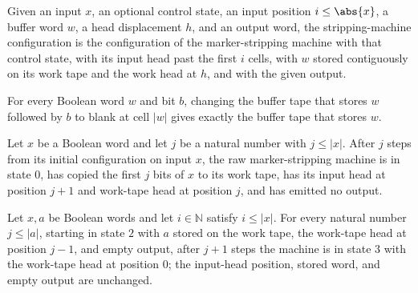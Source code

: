 \begin{definition}
\label{Turing.FinTM.stripCfg}
\leanok
{}
Given an input $x$, an optional control state, an input position
$i \le \abs{x}$, a buffer word $w$, a head displacement $h$, and an output
word, the stripping-machine configuration is the configuration of the
marker-stripping machine with that control state, with its input head past
the first $i$ cells, with $w$ stored contiguously on its work tape and the
work head at $h$, and with the given output.
\end{definition}

\begin{lemma}
\label{Turing.FinTM.catalogBuffer_erase}
\leanok
{}
For every Boolean word $w$ and bit $b$, changing the buffer tape that stores $w$
followed by $b$ to blank at cell $|w|$ gives exactly the buffer tape that stores $w$.
\end{lemma}

\begin{lemma}
\label{Turing.FinTM.rawStrip_copy}
\leanok
{}
Let $x$ be a Boolean word and let $j$ be a natural number with $j\le |x|$. After $j$
steps from its initial configuration on input $x$, the raw marker-stripping machine is
in state $0$, has copied the first $j$ bits of $x$ to its work tape, has its input head
at position $j+1$ and work-tape head at position $j$, and has emitted no output.
\end{lemma}

\begin{lemma}
\label{Turing.FinTM.rawStrip_rewind}
\leanok
{}
Let $x,a$ be Boolean words and let $i\in\mathbb{N}$ satisfy $i\le |x|$. For every
natural number $j\le |a|$, starting in state $2$ with $a$ stored on the work tape, the
work-tape head at position $j-1$, and empty output, after $j+1$ steps the machine is in
state $3$ with the work-tape head at position $0$; the input-head position, stored word,
and empty output are unchanged.
\end{lemma}


